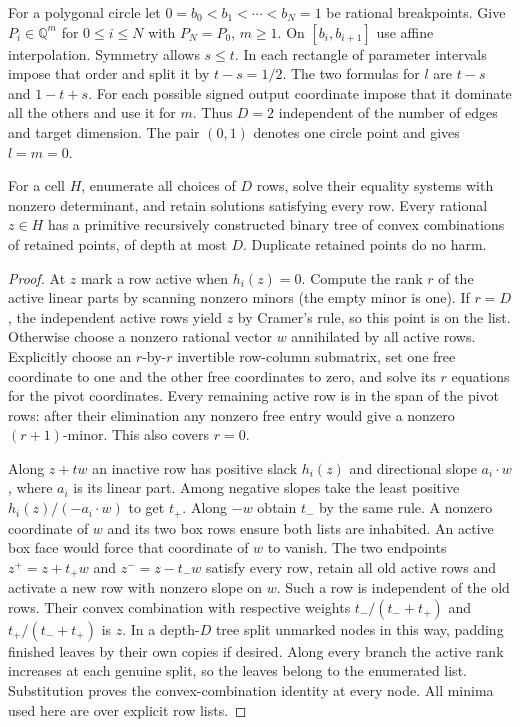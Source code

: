 For a polygonal circle let $0=b_0<b_1<\cdots<b_N=1$ be rational breakpoints. Give $P_i\in\mathbb Q^m$ for $0\le i\le N$ with $P_N=P_0$, $m\ge1$. On $[b_i,b_{i+1}]$ use affine interpolation. Symmetry allows $s\le t$. In each rectangle of parameter intervals impose that order and split it by $t-s=1/2$. The two formulas for $l$ are $t-s$ and $1-t+s$. For each possible signed output coordinate impose that it dominate all the others and use it for $m$. Thus $D=2$ independent of the number of edges and target dimension. The pair $(0,1)$ denotes one circle point and gives $l=m=0$.

\begin{lemma}\label{lem:pairvertex}
For a cell $H$, enumerate all choices of $D$ rows, solve their equality systems with nonzero determinant, and retain solutions satisfying every row. Every rational $z\in H$ has a primitive recursively constructed binary tree of convex combinations of retained points, of depth at most $D$. Duplicate retained points do no harm.
\end{lemma}
\begin{proof}
At $z$ mark a row active when $h_i(z)=0$. Compute the rank $r$ of the active linear parts by scanning nonzero minors (the empty minor is one). If $r=D$, the independent active rows yield $z$ by Cramer's rule, so this point is on the list. Otherwise choose a nonzero rational vector $w$ annihilated by all active rows. Explicitly choose an $r$-by-$r$ invertible row-column submatrix, set one free coordinate to one and the other free coordinates to zero, and solve its $r$ equations for the pivot coordinates. Every remaining active row is in the span of the pivot rows: after their elimination any nonzero free entry would give a nonzero $(r+1)$-minor. This also covers $r=0$.

Along $z+tw$ an inactive row has positive slack $h_i(z)$ and directional slope $a_i\cdot w$, where $a_i$ is its linear part. Among negative slopes take the least positive $h_i(z)/(-a_i\cdot w)$ to get $t_+$. Along $-w$ obtain $t_-$ by the same rule. A nonzero coordinate of $w$ and its two box rows ensure both lists are inhabited. An active box face would force that coordinate of $w$ to vanish. The two endpoints $z^+=z+t_+w$ and $z^-=z-t_-w$ satisfy every row, retain all old active rows and activate a new row with nonzero slope on $w$. Such a row is independent of the old rows. Their convex combination with respective weights $t_-/(t_-+t_+)$ and $t_+/(t_-+t_+)$ is $z$. In a depth-$D$ tree split unmarked nodes in this way, padding finished leaves by their own copies if desired. Along every branch the active rank increases at each genuine split, so the leaves belong to the enumerated list. Substitution proves the convex-combination identity at every node. All minima used here are over explicit row lists.
\end{proof}


